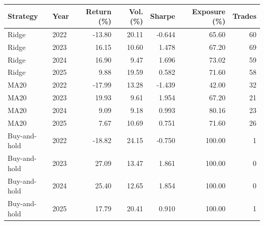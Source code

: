 \begin{tabular}{@{}llrrrrr@{}}
\toprule
Strategy & Year & Return (\%) & Vol. (\%) & Sharpe & Exposure (\%) & Trades \\
\midrule
Ridge & 2022 & -13.80 & 20.11 & -0.644 & 65.60 & 60 \\
Ridge & 2023 & 16.15 & 10.60 & 1.478 & 67.20 & 69 \\
Ridge & 2024 & 16.90 & 9.47 & 1.696 & 73.02 & 59 \\
Ridge & 2025 & 9.88 & 19.59 & 0.582 & 71.60 & 58 \\
MA20 & 2022 & -17.99 & 13.28 & -1.439 & 42.00 & 32 \\
MA20 & 2023 & 19.93 & 9.61 & 1.954 & 67.20 & 21 \\
MA20 & 2024 & 9.09 & 9.18 & 0.993 & 80.16 & 23 \\
MA20 & 2025 & 7.67 & 10.69 & 0.751 & 71.60 & 26 \\
Buy-and-hold & 2022 & -18.82 & 24.15 & -0.750 & 100.00 & 1 \\
Buy-and-hold & 2023 & 27.09 & 13.47 & 1.861 & 100.00 & 0 \\
Buy-and-hold & 2024 & 25.40 & 12.65 & 1.854 & 100.00 & 0 \\
Buy-and-hold & 2025 & 17.79 & 20.41 & 0.910 & 100.00 & 1 \\
\bottomrule
\end{tabular}
